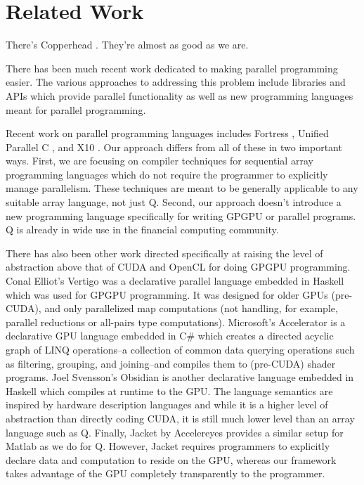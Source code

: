 \documentclass[preprint]{sigplanconf}
\begin{document}
\section{Related Work}
\label{RelatedWork}

There's Copperhead \cite{Cata10}.  They're almost as good as we are.

There has been much recent work dedicated to making parallel programming easier.
The various approaches to addressing this problem include libraries and APIs
which provide parallel functionality as well as new programming languages meant
for parallel programming.

Recent work on parallel programming languages includes Fortress \cite{Alle08},
Unified Parallel C \cite{Char05}, and X10 \cite{Chen05}.  Our approach differs
from all of these in two important ways.  First, we are focusing on compiler
techniques for sequential array programming languages which do not require the
programmer to explicitly manage parallelism.  These techniques are meant to be
generally applicable to any suitable array language, not just Q.  Second, our
approach doesn't introduce a new programming language specifically for writing
GPGPU or parallel programs.  Q is already in wide use in the financial computing
community.

There has also been other work directed specifically at raising the level of
abstraction above that of CUDA and OpenCL for doing GPGPU programming.  Conal
Elliot's Vertigo \cite{Elli04} was a declarative parallel language embedded in
Haskell which was used for GPGPU programming.  It was designed for older GPUs
(pre-CUDA), and only parallelized map computations (not handling, for example,
parallel reductions or all-pairs type computations).  Microsoft's Accelerator
\cite{Tard06} is a declarative GPU language embedded in C\# which creates a
directed acyclic graph of LINQ operations--a collection of common data querying
operations such as filtering, grouping, and joining--and compiles them to
(pre-CUDA) shader programs.  Joel Svensson's Obsidian \cite{Sven08} is another
declarative language embedded in Haskell which compiles at runtime to the GPU.
The language semantics are inspired by hardware description languages and while
it is a higher level of abstraction than directly coding CUDA, it is still much
lower level than an array language such as Q.  Finally, Jacket by Accelereyes
\cite{AcceJa} provides a similar setup for Matlab as we do for Q.  However,
Jacket requires programmers to explicitly declare data and computation to reside
on the GPU, whereas our framework takes advantage of the GPU completely
transparently to the programmer.
\end{document}
